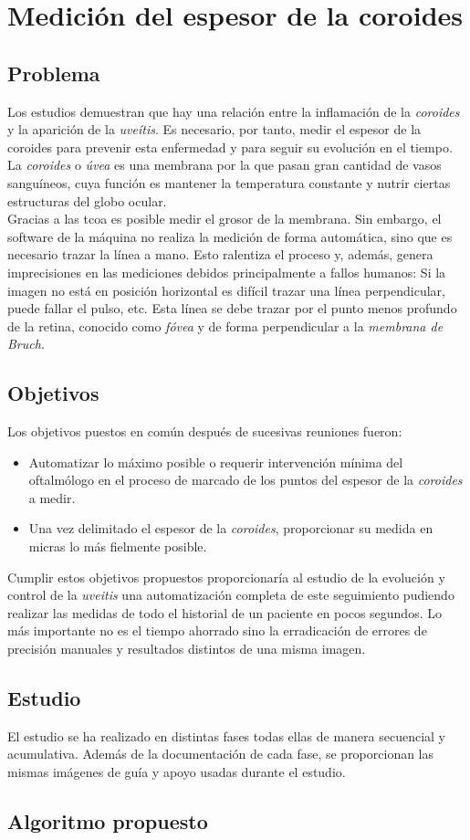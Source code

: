 \chapter{Medición del espesor de la coroides}
\section{Problema}
Los estudios demuestran que hay una relación
entre la inflamación de la \emph{coroides}
y la aparición de la \emph{uveítis}. Es 
necesario, por tanto, medir el espesor de
la coroides para prevenir esta enfermedad
y para seguir su evolución en el tiempo.\\
La \emph{coroides} o \emph{úvea} es una 
membrana por la que pasan gran cantidad de 
vasos sanguíneos, cuya función es mantener 
la temperatura constante y nutrir ciertas 
estructuras del globo ocular. \\
Gracias a las \gls{tcoa} es posible medir 
el grosor de la membrana. Sin embargo, 
el software de la máquina no realiza la 
medición de forma automática, sino que es 
necesario trazar la línea a mano. Esto 
ralentiza el proceso y, además, 
genera imprecisiones en las mediciones 
debidos principalmente a fallos humanos: 
Si la imagen no está en posición horizontal
es difícil trazar una línea perpendicular, 
puede fallar el pulso, etc. Esta línea se 
debe trazar por el punto menos profundo 
 de la retina, conocido como 
\emph{fóvea} y de forma perpendicular a la  
\emph{membrana de Bruch}.


\section{Objetivos}
Los objetivos puestos en común después de sucesivas reuniones fueron:
\begin{itemize}
\item Automatizar lo máximo posible o requerir intervención mínima del
  oftalmólogo en el proceso de marcado de los puntos del espesor de la
  \emph{coroides} a medir.
\item Una vez delimitado el espesor de la \emph{coroides}, proporcionar su
  medida en micras lo más fielmente posible.
\end{itemize}
Cumplir estos objetivos propuestos proporcionaría al estudio de la
evolución y control de la \emph{uveitis} una automatización completa
de este seguimiento pudiendo realizar las medidas de todo el historial
de un paciente en pocos segundos. Lo más importante no es el tiempo
ahorrado sino la erradicación de errores de precisión manuales y
resultados distintos de una misma imagen.

\section{Estudio}
El estudio se ha realizado en distintas fases todas ellas de manera
secuencial y acumulativa. Además de la documentación de cada fase, se
proporcionan las mismas imágenes de guía y apoyo usadas durante el estudio.
\section{Algoritmo propuesto}
